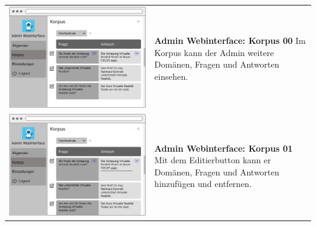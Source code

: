 \begin{tabular}{C{6cm}  L{7cm}}
    \includegraphics[width=\linewidth]{bilder/new vers. UI Design/Korpus/Admin Interface 00.png} & \textbf{Admin Webinterface: Korpus 00} \newline 
    Im Korpus kann der Admin weitere Domänen, Fragen und Antworten einsehen. \\
    \includegraphics[width=\linewidth]{bilder/new vers. UI Design/Korpus/Admin Interface 01.png} & \textbf{Admin Webinterface: Korpus 01} \newline 
    Mit dem Editierbutton kann er Domänen, Fragen und Antworten hinzufügen und entfernen. \\

\end{tabular}
